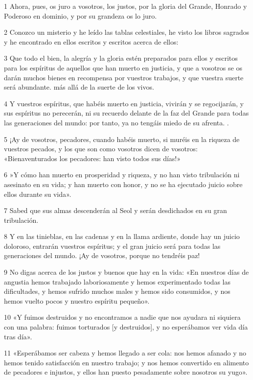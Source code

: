 \par 1 Ahora, pues, os juro a vosotros, los justos, por la gloria del Grande, Honrado y Poderoso en dominio, y por su grandeza os lo juro.
\par 2 Conozco un misterio y he leído las tablas celestiales, he visto los libros sagrados y he encontrado en ellos escritos y escritos acerca de ellos:
\par 3 Que todo el bien, la alegría y la gloria estén preparados para ellos y escritos para los espíritus de aquellos que han muerto en justicia, y que a vosotros se os darán muchos bienes en recompensa por vuestros trabajos, y que vuestra suerte será abundante. más allá de la suerte de los vivos.
\par 4 Y vuestros espíritus, que habéis muerto en justicia, vivirán y se regocijarán, y sus espíritus no perecerán, ni su recuerdo delante de la faz del Grande para todas las generaciones del mundo: por tanto, ya no tengáis miedo de su afrenta. .
\par 5 ¡Ay de vosotros, pecadores, cuando habéis muerto, si muréis en la riqueza de vuestros pecados, y los que son como vosotros dicen de vosotros: «Bienaventurados los pecadores: han visto todos sus días!»
\par 6 »Y cómo han muerto en prosperidad y riqueza, y no han visto tribulación ni asesinato en su vida; y han muerto con honor, y no se ha ejecutado juicio sobre ellos durante su vida».
\par 7 Sabed que sus almas descenderán al Seol y serán desdichados en su gran tribulación.
\par 8 Y en las tinieblas, en las cadenas y en la llama ardiente, donde hay un juicio doloroso, entrarán vuestros espíritus; y el gran juicio será para todas las generaciones del mundo. ¡Ay de vosotros, porque no tendréis paz!
\par 9 No digas acerca de los justos y buenos que hay en la vida: «En nuestros días de angustia hemos trabajado laboriosamente y hemos experimentado todas las dificultades, y hemos sufrido muchos males y hemos sido consumidos, y nos hemos vuelto pocos y nuestro espíritu pequeño».
\par 10 «Y fuimos destruidos y no encontramos a nadie que nos ayudara ni siquiera con una palabra: fuimos torturados [y destruidos], y no esperábamos ver vida día tras día».
\par 11 «Esperábamos ser cabeza y hemos llegado a ser cola: nos hemos afanado y no hemos tenido satisfacción en nuestro trabajo; y nos hemos convertido en alimento de pecadores e injustos, y ellos han puesto pesadamente sobre nosotros su yugo».
